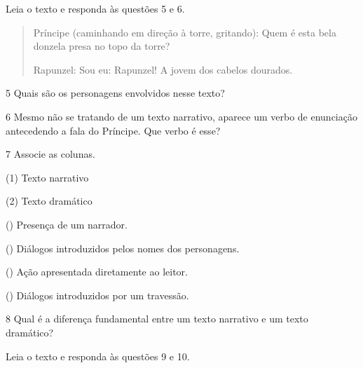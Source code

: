 Leia o texto e responda às questões 5 e 6.

\begin{quote}
Príncipe (caminhando em direção à torre, gritando): Quem é esta bela
donzela presa no topo da torre?

Rapunzel: Sou eu: Rapunzel! A jovem dos cabelos dourados.
\end{quote}

\num{5} Quais são os personagens envolvidos nesse texto?


\num{6} Mesmo não se tratando de um texto narrativo, aparece um verbo de enunciação antecedendo a fala do Príncipe. Que verbo é esse?


\pagebreak
\num{7} Associe as colunas.

{\setlength{\columnsep}{-5cm}
\begin{multicols}{2}
(1) Texto narrativo

(2) Texto dramático

\columnbreak

({}) Presença de um narrador.

({}) Diálogos introduzidos pelos nomes dos personagens.

({}) Ação apresentada diretamente ao leitor.

({}) Diálogos introduzidos por um travessão.
\end{multicols}
}

\num{8} Qual é a diferença fundamental entre um texto narrativo e um texto dramático?



Leia o texto e responda às questões 9 e 10.\medskip

